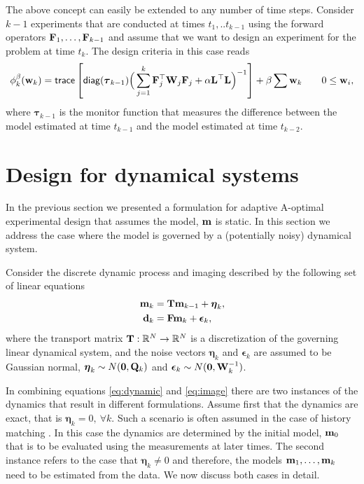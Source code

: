 \documentclass[leqno,onefignum,onetabnum]{siamltexmm}
\newcommand{\bfF}	{{\bf{F}}}
\newcommand{\bfL}	{{\bf{L}}}
\newcommand{\bfQ}	{{\bf{Q}}}
\newcommand{\bfT}	{{\bf{T}}}
\newcommand{\bfW}	{{\bf{W}}}
\newcommand{\bfd}	{{\bf{d}}}
\newcommand{\bfm}	{{\bf{m}}}
\newcommand{\bfw}	{{\bf{w}}}
\newcommand{\bfepsilon} {{\boldsymbol \epsilon}}
\newcommand{\bfeta}     {{\boldsymbol \eta}}
\newcommand{\bftau}      {{\boldsymbol \tau}}
\newcommand {\zero}  {{\bf 0}}
\newcommand{\LtL}       { \bfL^{\top}\bfL}
\begin{document}
The above concept can  easily be extended to any number of time steps.
Consider $k-1$ experiments that are conducted at times $t_1,..t_{k-1}$ using
the forward operators $\bfF_{1},\ldots,\bfF_{k-1}$ and assume that we want to design an experiment 
for the problem at time $t_{k}$. The design criteria in this case reads
\begin{align}
\label{amsek}
\phi_{k}^{\beta}(\bfw_{k}) =  {\sf trace} \left[  {\sf diag}(\bftau_{k-1}) \Big(\sum_{j=1}^{k}\bfF_{j}^{\top}\bfW_{j}\bfF_{j}   +
\alpha \LtL\Big)^{-1} \right] + \beta \sum \bfw_{k}\quad \quad 0 \le \bfw_i, 
\end{align}
where $\bftau_{k-1}$ is the monitor function that measures the difference between the model estimated
at time $t_{k-1}$ and the model estimated at time $t_{k-2}$.


\section{Design for dynamical systems}
\label{sec:Dynamic}
In the previous section we presented a formulation for adaptive A-optimal experimental 
design that assumes  the model, $\bfm$
is static. 
In this section we address the case where the model is governed by a (potentially noisy)
dynamical system.

Consider the discrete  dynamic process and imaging  described  by the following set of linear equations
\begin{subequations}
\begin{align}
\label{eq:dynamic}
\bfm _k&= \bfT\bfm_{k-1} + {\bfeta}_k,\\
\label{eq:image}
\bfd_k &= \bfF \bfm_k + {\bfepsilon}_k,
\end{align}  
\end{subequations}
where the transport matrix $\bfT: \mathbb{R}^{N} \rightarrow \mathbb{R}^{N}$  is
 a discretization of the governing linear dynamical  system, and the noise vectors $\bfeta_k $ and $\bfepsilon_k $ are assumed to be Gaussian normal, $\bfeta_k \sim N(\zero,\bfQ_k)$ and ${\bfepsilon_k} \sim N(\zero,\bfW^{-1}_k)$.

In combining equations \eqref{eq:dynamic} and \eqref{eq:image}  there are two instances of the 
dynamics that result in different formulations. 
Assume first that the dynamics are exact, that is $\bfeta_{k}=0, \ \forall  k$.
Such a scenario is often assumed in the case of history matching \cite{Oliver2010a}. In this
case the dynamics are determined by the initial model, $\bfm_{0}$ that is to be evaluated
using the measurements at later times. The second  instance refers to the case that
$\bfeta_{k} \not=0$ and therefore, the models $\bfm_{1},\ldots,\bfm_{k}$ need to be estimated
from the data. We now discuss both cases in detail. 
\end{document}
